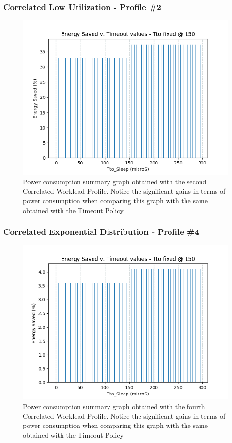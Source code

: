 \documentclass[a4paper]{article}
\begin{document}
        \subsubsection{Correlated Low Utilization - Profile \#2}
            \begin{figure}[htp]
                \centering
                \includegraphics[width=0.42 \columnwidth]{./screenshots/Hist_case2.png}
                \caption{
                        \label{fig:Hist_case2}
                        Power consumption summary graph obtained with the second Correlated Workload Profile. Notice the significant gains in terms of power consumption when comparing this graph with the same obtained with the Timeout Policy.
                }
            \end{figure}

        \subsubsection{Correlated Exponential Distribution - Profile \#4}
            \begin{figure}[htp]
                \centering
                \includegraphics[width=0.42 \columnwidth]{./screenshots/Hist_case4.png}
                \caption{
                        \label{fig:Hist_case4}
                        Power consumption summary graph obtained with the fourth Correlated Workload Profile. Notice the significant gains in terms of power consumption when comparing this graph with the same obtained with the Timeout Policy.
                }
        \end{figure}
\end{document}
